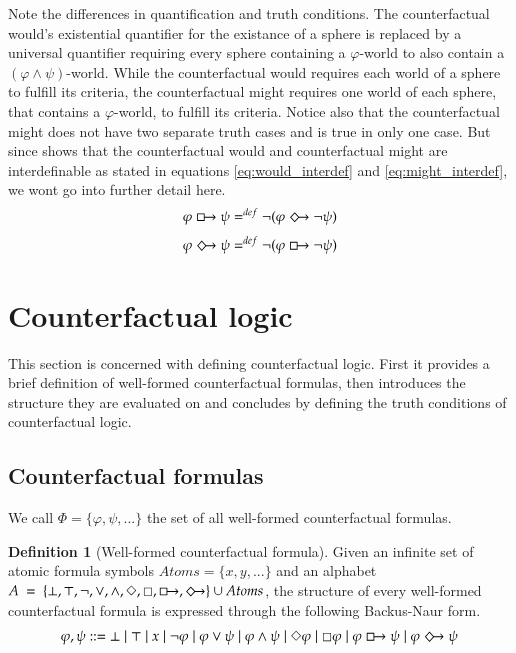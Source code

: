 \documentclass[a4paper,american,10pt]{paper}
\theoremstyle{definition}\newtheorem{definition}{Definition}
\begin{document}
\noindent Note the differences in quantification and truth conditions. The counterfactual would's existential quantifier for the existance of a sphere is replaced by a universal quantifier requiring every sphere containing a $\varphi$-world to also contain a $(\varphi\wedge\psi)$-world. While the counterfactual would requires each world of a sphere to fulfill its criteria, the counterfactual might requires one world of each sphere, that contains a $\varphi$-world, to fulfill its criteria. Notice also that the counterfactual might does not have two separate truth cases and is true in only one case. But since \cite{lewis_counterfactuals_1973} shows that the counterfactual would and counterfactual might are interdefinable as stated in equations \ref{eq:would_interdef} and \ref{eq:might_interdef}, we wont go into further detail here.
\begin{equation}
\label{eq:would_interdef}
\varphi\boxright\psi =^{def} \neg (\varphi\Diamondright\neg\psi )
\end{equation}
\begin{equation}
\label{eq:might_interdef}
\varphi\Diamondright\psi =^{def} \neg (\varphi\boxright\neg\psi )
\end{equation}

\section{Counterfactual logic}
This section is concerned with defining counterfactual logic. First it provides a brief definition of well-formed counterfactual formulas, then introduces the structure they are evaluated on and concludes by defining the truth conditions of counterfactual logic.

\subsection{Counterfactual formulas}
We call $\Phi = \{\varphi ,\psi ,...\}$ the set of all well-formed counterfactual formulas.
\begin{definition}[Well-formed counterfactual formula]
Given an infinite set of atomic formula symbols $Atoms = \{ x, y, ...\}$ and an alphabet $A~=~\{\bot ,\top ,\neg ,\vee ,\wedge ,\Diamond ,\Box ,\boxright ,\Diamondright\}\cup Atoms$, the structure of every well-formed counterfactual formula is expressed through the following Backus-Naur form.
\begin{equation}
\varphi, \psi ::= \bot \mid \top \mid x \mid \neg \varphi \mid \varphi \vee \psi \mid \varphi \wedge \psi \mid \Diamond \varphi \mid \Box \varphi \mid \varphi \boxright \psi \mid \varphi \Diamondright \psi
\end{equation}
\end{definition}
\end{document}
